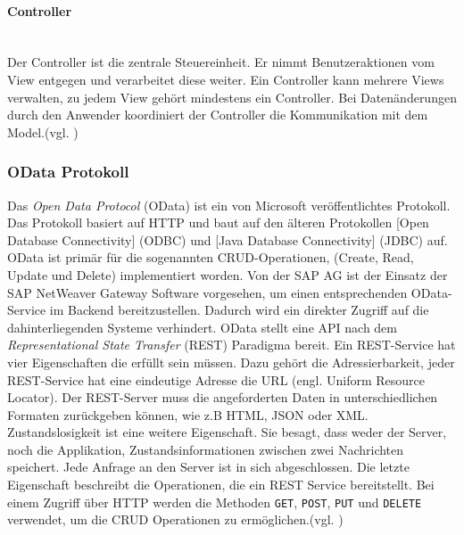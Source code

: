 \paragraph{Controller}$\;$ \\
Der Controller ist die zentrale Steuereinheit. Er nimmt Benutzeraktionen vom View entgegen und verarbeitet diese weiter. Ein Controller kann mehrere Views verwalten, zu jedem View gehört mindestens ein Controller. Bei Datenänderungen durch den Anwender koordiniert der Controller die Kommunikation mit dem Model.(vgl. \cite[S.123f]{AntoEinf2014})

\subsubsection{OData Protokoll}
\glqq Das \textit{Open Data Protocol} (OData) ist ein von Microsoft veröffentlichtes Protokoll. Das Protokoll basiert auf HTTP und baut auf den älteren Protokollen [Open Database Connectivity] (ODBC) und [Java Database Connectivity] (JDBC) auf. OData ist primär für die sogenannten CRUD-Operationen, (Create, Read, Update und Delete) implementiert worden.\grqq{}\cite[S.168]{AntoEinf2014} Von der SAP AG ist der Einsatz der SAP NetWeaver Gateway Software vorgesehen, um einen entsprechenden OData-Service im Backend bereitzustellen. Dadurch wird ein direkter Zugriff auf die dahinterliegenden Systeme verhindert. OData stellt eine API nach dem \textit{Representational State Transfer} (REST) Paradigma bereit. Ein REST-Service hat vier Eigenschaften die erfüllt sein müssen. Dazu gehört die Adressierbarkeit, jeder REST-Service hat eine eindeutige Adresse die URL (engl. Uniform Resource Locator). Der REST-Server muss die angeforderten Daten in unterschiedlichen Formaten zurückgeben können, wie z.B HTML, JSON oder XML. Zustandslosigkeit ist eine weitere Eigenschaft. Sie besagt, dass weder der Server, noch die Applikation, Zustandsinformationen zwischen zwei Nachrichten speichert. Jede Anfrage an den Server ist in sich abgeschlossen. Die letzte Eigenschaft beschreibt die Operationen, die ein REST Service bereitstellt. Bei einem Zugriff über HTTP werden die Methoden \texttt{GET}, \texttt{POST}, \texttt{PUT} und \texttt{DELETE} verwendet, um die CRUD Operationen zu ermöglichen.(vgl. \cite{wikirest})


